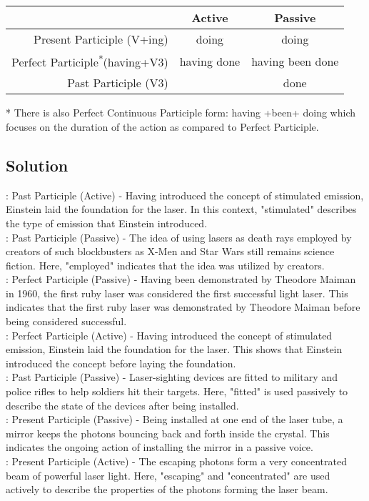 \begin{small}
      \begin{tabular}{|r|c|c|}
            \hline
                                                             & Active      & Passive          \\
            \hline
            Present Participle (V+ing)                       & doing       & doing            \\
            Perfect Participle\textsuperscript{*}(having+V3) & having done & having been done \\
            Past Participle (V3)                             &             & done             \\
            \hline
      \end{tabular}
\end{small}

* There is also Perfect Continuous Participle form: having +been+ doing which focuses on the
duration of the action as compared to Perfect Participle.

\subsection*{Solution}
: Past Participle (Active) - Having introduced the concept of stimulated emission, Einstein laid the foundation for the laser. In this context, "stimulated" describes the type of emission that Einstein introduced. \\
: Past Participle (Passive) - The idea of using lasers as death rays employed by creators of such blockbusters as X-Men and Star Wars still remains science fiction. Here, "employed" indicates that the idea was utilized by creators. \\
: Perfect Participle (Passive) - Having been demonstrated by Theodore Maiman in 1960, the first ruby laser was considered the first successful light laser. This indicates that the first ruby laser was demonstrated by Theodore Maiman before being considered successful. \\
: Perfect Participle (Active) - Having introduced the concept of stimulated emission, Einstein laid the foundation for the laser. This shows that Einstein introduced the concept before laying the foundation. \\
: Past Participle (Passive) - Laser-sighting devices are fitted to military and police rifles to help soldiers hit their targets. Here, "fitted" is used passively to describe the state of the devices after being installed. \\
: Present Participle (Passive) - Being installed at one end of the laser tube, a mirror keeps the photons bouncing back and forth inside the crystal. This indicates the ongoing action of installing the mirror in a passive voice. \\
: Present Participle (Active) - The escaping photons form a very concentrated beam of powerful laser light. Here, "escaping" and "concentrated" are used actively to describe the properties of the photons forming the laser beam.

